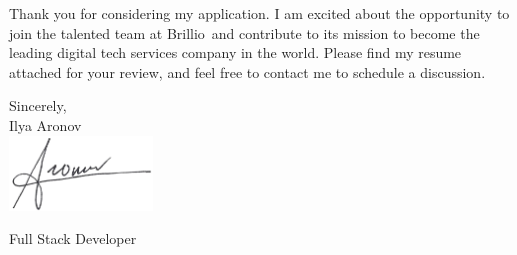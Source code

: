 \documentclass[11pt]{letter}
\def\myname{Ilya Aronov}
\def\mytitle{Full Stack Developer}
\def\companyName{Brillio}
\def\companyMission{to become the leading digital tech services company in the world}
\begin{document}
Thank you for considering my application. I am excited about the opportunity to join the talented team at \companyName\, and contribute to its mission \companyMission.
Please find my resume attached for your review, and feel free to contact me to schedule a discussion.


\vspace{0.1in}
\vfill

\begin{flushright}

\vspace{-0.1in}
Sincerely, \\
\myname\\

\includegraphics[width=1.5in]{signiture_no_background.png}

\vspace{-0.1in}
\mytitle

\end{flushright}
\end{document}
